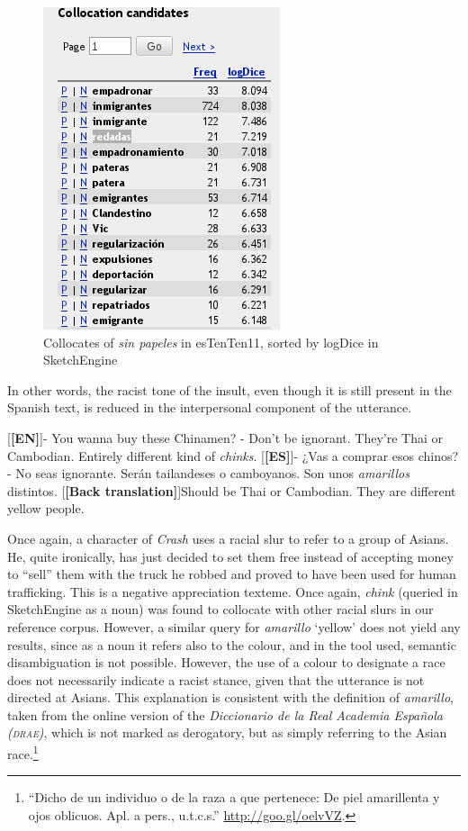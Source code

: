 \documentclass[output=paper]{LSP/langsci}
\begin{document}
\begin{figure}
\includegraphics[width=.4\textwidth]{./figures/4-6.png}
\caption{Collocates of \emph{sin papeles} in esTenTen11, sorted by logDice in SketchEngine} \label{fig:2:7}
\end{figure}

In other words, the racist tone of the insult, even though it is still present in the Spanish text, is reduced in the interpersonal component of the utterance.

\ea \label{ex:2:27}
\begin{xlist}
\exi{}[\textbf{[EN]}]{- You wanna buy these Chinamen? - Don't be ignorant. They're Thai or Cambodian. Entirely different kind of \emph{chinks}.}
\exi{}[\textbf{[ES]}]{- ¿Vas a comprar esos chinos? - No seas ignorante. Serán tailandeses o camboyanos. Son unos \emph{amarillos} distintos.}
\exi{}[\textbf{[Back translation]}]{Should be Thai or Cambodian. They are different yellow people.}
\end{xlist}
\z

Once again, a character of \textit{Crash} uses a racial slur to refer to a group of Asians. He, quite ironically, has just decided to set them free instead of accepting money to “sell” them with the truck he robbed and proved to have been used for human trafficking. This is a negative appreciation texteme. Once again, \textit{chink} (queried in SketchEngine as a noun) was found to collocate with other racial slurs in our reference corpus. However, a similar query for \textit{amarillo} `yellow' does not yield any results, since as a noun it refers also to the colour, and in the tool used, semantic disambiguation is not possible. However, the use of a colour to designate a race does not necessarily indicate a racist stance, given that the utterance is not directed at Asians. This explanation is consistent with the definition of \textit{amarillo}, taken from the online version of the \textit{Diccionario de la Real Academia Española} \textit{(\textsc{drae})}, which is not marked as derogatory, but as simply referring to the Asian race.\footnote{“Dicho de un individuo o de la raza a que pertenece: De piel amarillenta y ojos oblicuos. Apl. a pers., u.t.c.s.” \url{http://goo.gl/oelvVZ}.}
\end{document}
